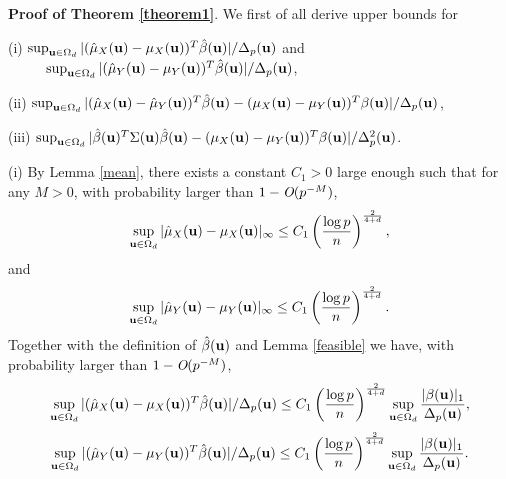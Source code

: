 \documentclass[11pt]{article}
\theoremstyle{definition}
\begin{document}
 
 
 
 \noindent
 {\bf Proof of Theorem \ref{theorem1}}.
 We first of all derive upper bounds for
 
 (i) $ \sup_{{\bf u}\in \Omega_d}|(\hat{\mu}_X({\bf u})-\mu_X({\bf u}))^T\hat{\beta}({\bf u}) |/\Delta_p({\bf u})$ and \\
 $~~~~~~~~\sup_{{\bf u}\in \Omega_d}|(\hat{\mu}_Y({\bf u})-\mu_Y({\bf u}))^T\hat{\beta}({\bf u}) |/\Delta_p({\bf u})$,
 
 (ii) $\sup_{{\bf u}\in \Omega_d}|(\hat{\mu}_X({\bf u})-\hat{\mu}_Y({\bf u}))^T\hat{\beta}({\bf u})-
 (\mu_X({\bf u})-\mu_Y({\bf u}))^T\beta({\bf u})|/\Delta_p({\bf u})$,
 
 (iii) $\sup_{{\bf u}\in \Omega_d} |\hat{\beta}({\bf u})^T\Sigma({\bf u})\hat{\beta}({\bf u}) - (\mu_X({\bf u})-\mu_Y({\bf u}))^T\beta({\bf u}) |/\Delta^2_p({\bf u})$.
 
 
 (i) By Lemma \ref{mean}, there exists a constant $C_1>0$ large enough such that for any $M>0$, with probability larger than $1-\emph{O}(p^{-M})$,
 \begin{equation}\label{i1}
 	\sup_{{\bf u}\in \Omega_d}|\hat{\mu}_X({\bf u})-\mu_X({\bf u})|_{\infty}\leq C_1\left(\frac{\log p}{n}\right)^{\frac{2}{4+d}},
 \end{equation}
 and
 \begin{equation}\label{i2}
 	\sup_{{\bf u}\in \Omega_d}|\hat{\mu}_Y({\bf u})-\mu_Y({\bf u})|_{\infty}\leq C_1\left(\frac{\log p}{n}\right)^{\frac{2}{4+d}}.
 \end{equation}
 Together with the definition of $\hat{\beta}({\bf u})$ and Lemma \ref{feasible}  we have, with probability larger than $1-\emph{O}(p^{-M})$,
 \begin{equation}\label{i00}
 	\sup_{{\bf u}\in \Omega_d}|(\hat{\mu}_X({\bf u})-\mu_X({\bf u}))^T\hat{\beta}({\bf u}) |/\Delta_p({\bf u})\leq C_1\left(\frac{\log p}{n}\right)^{\frac{2}{4+d}} \sup_{{\bf u}\in \Omega_d}\frac{|\beta({\bf u})|_1}{\Delta_p({\bf u})},
 \end{equation}
 \begin{equation}\label{i01}
 	\sup_{{\bf u}\in \Omega_d}|(\hat{\mu}_Y({\bf u})-\mu_Y({\bf u}))^T\hat{\beta}({\bf u}) |/\Delta_p({\bf u})\leq C_1\left(\frac{\log p}{n}\right)^{\frac{2}{4+d}} \sup_{{\bf u}\in \Omega_d}\frac{|\beta({\bf u})|_1}{\Delta_p({\bf u})}.
 \end{equation}
 
\end{document}
